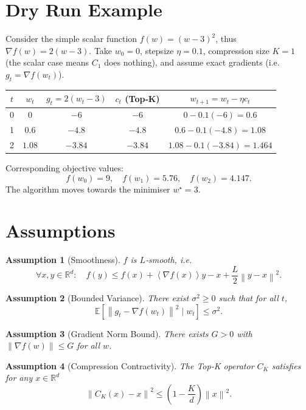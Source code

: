 \documentclass{article}
\newcommand{\EE}{\mathbb{E}}
\newcommand{\RR}{\mathbb{R}}
\newcommand{\norm}[1]{\left\lVert #1 \right\rVert}
\newcommand{\inner}[1]{\left\langle #1 \right\rangle}
\newtheorem{assumption}{Assumption}
\begin{document}
\section*{Dry Run Example}
Consider the simple scalar function $f(w)=(w-3)^{2}$, thus $\nabla f(w)=2(w-3)$.  
Take $w_{0}=0$, stepsize $\eta=0.1$, compression size $K=1$ (the scalar case means $C_{1}$ does nothing), and assume exact gradients (i.e. $g_t=\nabla f(w_t)$).  

\begin{center}
\begin{tabular}{c|c|c|c|c}
$t$ & $w_t$ & $g_t=2(w_t-3)$ & $c_t$ (Top‑K) & $w_{t+1}=w_t-\eta c_t$ \\ \hline
0 & $0$ & $-6$ & $-6$ & $0-0.1(-6)=0.6$ \\
1 & $0.6$ & $-4.8$ & $-4.8$ & $0.6-0.1(-4.8)=1.08$ \\
2 & $1.08$ & $-3.84$ & $-3.84$ & $1.08-0.1(-3.84)=1.464$ 
\end{tabular}
\end{center}
Corresponding objective values:
\[
f(w_0)=9,\quad f(w_1)=5.76,\quad f(w_2)=4.147.
\]
The algorithm moves towards the minimiser $w^{\star}=3$.

\newpage

\section*{Assumptions}
\begin{assumption}[Smoothness]\label{as:smooth}
$f$ is $L$‑smooth, i.e.
\[
    \forall x,y\in\RR^{d}:\quad
    f(y)\le f(x)+\inner{\nabla f(x)}{y-x}+\frac{L}{2}\norm{y-x}^{2}.
\]
\end{assumption}

\begin{assumption}[Bounded Variance]\label{as:variance}
There exist $\sigma^{2}\ge0$ such that for all $t$,
\[
    \EE\!\left[\norm{g_t-\nabla f(w_t)}^{2}\mid w_t\right]\le\sigma^{2}.
\]
\end{assumption}

\begin{assumption}[Gradient Norm Bound]\label{as:gradbound}
There exists $G>0$ with $\norm{\nabla f(w)}\le G$ for all $w$.
\end{assumption}

\begin{assumption}[Compression Contractivity]\label{as:compress}
The Top‑K operator $C_{K}$ satisfies for any $x\in\RR^{d}$
\[
    \norm{C_{K}(x)-x}^{2}\le\left(1-\frac{K}{d}\right)\norm{x}^{2}.
\]
\end{assumption}
\end{document}
